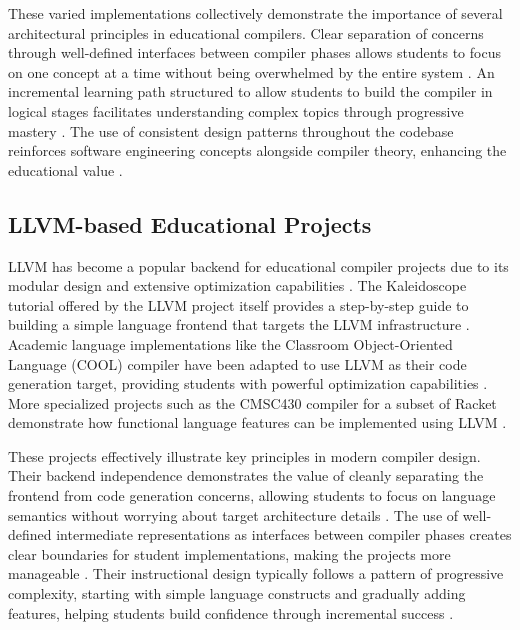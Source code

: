 These varied implementations collectively demonstrate the importance of several architectural principles in educational compilers. Clear separation of concerns through well-defined interfaces between compiler phases allows students to focus on one concept at a time without being overwhelmed by the entire system \cite{appel1998modern}. An incremental learning path structured to allow students to build the compiler in logical stages facilitates understanding complex topics through progressive mastery \cite{patel2021comparing}. The use of consistent design patterns throughout the codebase reinforces software engineering concepts alongside compiler theory, enhancing the educational value \cite{appel1998modern}.

\subsection{LLVM-based Educational Projects}

LLVM has become a popular backend for educational compiler projects due to its modular design and extensive optimization capabilities \cite{lattner2004llvm}. The Kaleidoscope tutorial offered by the LLVM project itself provides a step-by-step guide to building a simple language frontend that targets the LLVM infrastructure \cite{lattner2004llvm}. Academic language implementations like the Classroom Object-Oriented Language (COOL) compiler have been adapted to use LLVM as their code generation target, providing students with powerful optimization capabilities \cite{aiken2003cool}. More specialized projects such as the CMSC430 compiler for a subset of Racket demonstrate how functional language features can be implemented using LLVM \cite{hsu2020compiler}.

These projects effectively illustrate key principles in modern compiler design. Their backend independence demonstrates the value of cleanly separating the frontend from code generation concerns, allowing students to focus on language semantics without worrying about target architecture details \cite{lattner2004llvm}. The use of well-defined intermediate representations as interfaces between compiler phases creates clear boundaries for student implementations, making the projects more manageable \cite{lattner2004llvm}. Their instructional design typically follows a pattern of progressive complexity, starting with simple language constructs and gradually adding features, helping students build confidence through incremental success \cite{aiken2003cool}.

